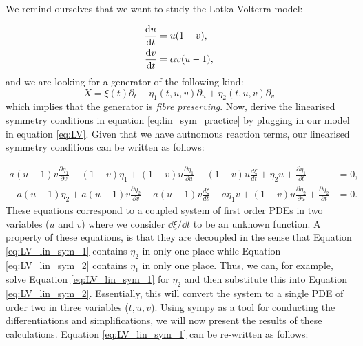 We remind ourselves that we want to study the Lotka-Volterra model:

\begin{equation*}
  \begin{split}
    \dv{u}{t}&=u(1-v),\\
    \dv{v}{t}&=\alpha v(u-1),\\    
    \end{split}
\end{equation*}
and we are looking for a generator of the following kind:
\begin{equation}
X=\xi(t)\partial_t+\eta_1(t,u,v)\partial_u+\eta_2(t,u,v)\partial_v
\end{equation}
which implies that the generator is \textit{fibre preserving}. Now, derive the linearised symmetry conditions in equation \eqref{eq:lin_sym_practice} by plugging in our model in equation \eqref{eq:LV}. Given that we have autnomous reaction terms, our linearised symmetry conditions can be written as follows:

\begin{align}
a \left(u - 1\right) v \frac{\partial\eta_{1}}{\partial v} - \left(1 - v\right) \eta_{1} + \left(1 - v\right) u \frac{\partial\eta_{1}}{\partial u} - \left(1 - v\right) u \frac{d\xi}{dt} + \eta_{2} u + \frac{\partial\eta_1}{\partial t}&=0,\label{eq:LV_lin_sym_1}\\
- a \left(u - 1\right) \eta_{2} + a \left(u - 1\right) v \frac{\partial\eta_{2}}{\partial v} - a \left(u - 1\right) v \frac{d\xi}{dt} - a \eta_{1} v + \left(1 - v\right) u \frac{\partial\eta_{2}}{\partial u} + \frac{\partial\eta_2}{\partial t}&=0.\label{eq:LV_lin_sym_2}
\end{align}
These equations correspond to a coupled system of first order PDEs in two variables ($u$ and $v$) where we consider $\dd\xi/\dd t$ to be an unknown function. A property of these equations, is that they are decoupled in the sense that Equation \eqref{eq:LV_lin_sym_1} contains $\eta_2$ in only one place while Equation \eqref{eq:LV_lin_sym_2} contains $\eta_1$ in only one place. Thus, we can, for example, solve Equation \eqref{eq:LV_lin_sym_1} for $\eta_2$ and then substitute this into Equation \eqref{eq:LV_lin_sym_2}. Essentially, this will convert the system to a single PDE of order two in three variables ($t,u,v$). Using sympy as a tool for conducting the differentiations and simplifications, we will now present the results of these calculations. Equation \eqref{eq:LV_lin_sym_1} can be re-written as follows:

